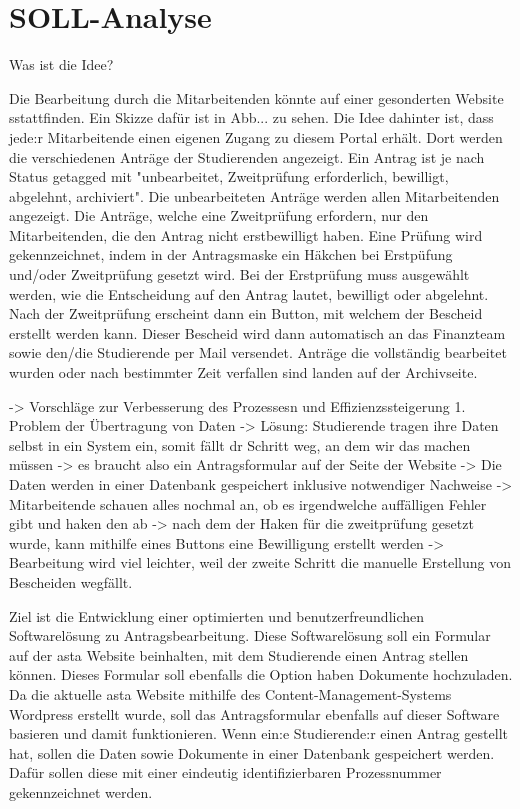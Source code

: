 
\chapter{SOLL-Analyse}\label{cha:soll}
Was ist die Idee?

Die Bearbeitung durch die Mitarbeitenden könnte auf einer gesonderten Website sstattfinden. Ein Skizze dafür ist in Abb... zu sehen. Die Idee dahinter ist, dass jede:r Mitarbeitende einen eigenen Zugang zu diesem Portal erhält. Dort werden die verschiedenen Anträge der Studierenden angezeigt. Ein Antrag ist je nach Status getagged mit "unbearbeitet, Zweitprüfung erforderlich, bewilligt, abgelehnt, archiviert". Die unbearbeiteten Anträge werden allen Mitarbeitenden angezeigt. Die Anträge, welche eine Zweitprüfung erfordern, nur den Mitarbeitenden, die den Antrag nicht erstbewilligt haben. Eine Prüfung wird gekennzeichnet, indem in der Antragsmaske ein Häkchen bei Erstpüfung und/oder Zweitprüfung gesetzt wird. Bei der Erstprüfung muss ausgewählt werden, wie die Entscheidung auf den Antrag lautet, bewilligt oder abgelehnt. Nach der Zweitprüfung erscheint dann ein Button, mit welchem der Bescheid erstellt werden kann. Dieser Bescheid wird dann automatisch an das Finanzteam sowie den/die Studierende per Mail versendet. Anträge die vollständig bearbeitet wurden oder nach bestimmter Zeit verfallen sind landen auf der Archivseite. 

    -> Vorschläge zur Verbesserung des Prozessesn und Effizienzssteigerung 
    1. Problem der Übertragung von Daten -> Lösung: Studierende tragen ihre Daten selbst in ein System ein, somit fällt dr Schritt weg, an dem wir das machen müssen -> es braucht also ein Antragsformular auf der Seite der Website
    -> Die Daten werden in einer Datenbank gespeichert inklusive notwendiger Nachweise
    -> Mitarbeitende schauen alles nochmal an, ob es irgendwelche auffälligen Fehler gibt und haken den ab 
    -> nach dem der Haken für die zweitprüfung gesetzt wurde, kann mithilfe eines Buttons eine Bewilligung erstellt werden 
    -> Bearbeitung wird viel leichter, weil der zweite Schritt die manuelle Erstellung von Bescheiden wegfällt. 
    
Ziel ist die Entwicklung einer optimierten und benutzerfreundlichen Softwarelösung zu Antragsbearbeitung. Diese Softwarelösung soll ein Formular auf der \gls{asta} Website beinhalten, mit dem Studierende einen Antrag stellen können. Dieses Formular soll ebenfalls die Option haben Dokumente hochzuladen. Da die aktuelle \gls{asta} Website mithilfe des Content-Management-Systems Wordpress erstellt wurde, soll das Antragsformular ebenfalls auf dieser Software basieren und damit funktionieren. Wenn ein:e Studierende:r einen Antrag gestellt hat, sollen die Daten sowie Dokumente in einer Datenbank gespeichert werden. Dafür sollen diese mit einer eindeutig identifizierbaren Prozessnummer gekennzeichnet werden. 



